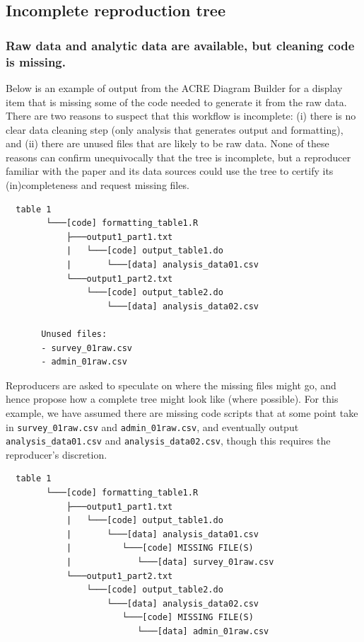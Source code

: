 \documentclass[]{book}
\begin{document}
\hypertarget{incomplete-reproduction-tree}{%
\subsection{Incomplete reproduction tree}\label{incomplete-reproduction-tree}}

\hypertarget{raw-data-and-analytic-data-are-available-but-cleaning-code-is-missing.}{%
\subsubsection{Raw data and analytic data are available, but cleaning code is missing.}\label{raw-data-and-analytic-data-are-available-but-cleaning-code-is-missing.}}

Below is an example of output from the ACRE Diagram Builder for a display item that is missing some of the code needed to generate it from the raw data. There are two reasons to suspect that this workflow is incomplete: (i) there is no clear data cleaning step (only analysis that generates output and formatting), and (ii) there are unused files that are likely to be raw data. None of these reasons can confirm unequivocally that the tree is incomplete, but a reproducer familiar with the paper and its data sources could use the tree to certify its (in)completeness and request missing files.

\begin{verbatim}
  table 1
        └───[code] formatting_table1.R
            ├───output1_part1.txt  
            |   └───[code] output_table1.do           
            |       └───[data] analysis_data01.csv
            └───output1_part2.txt  
                └───[code] output_table2.do           
                    └───[data] analysis_data02.csv

       Unused files: 
       - survey_01raw.csv
       - admin_01raw.csv  
\end{verbatim}

Reproducers are asked to speculate on where the missing files might go, and hence propose how a complete tree might look like (where possible). For this example, we have assumed there are missing code scripts that at some point take in \texttt{survey\_01raw.csv} and \texttt{admin\_01raw.csv}, and eventually output \texttt{analysis\_data01.csv} and \texttt{analysis\_data02.csv}, though this requires the reproducer's discretion.

\begin{verbatim}
  table 1
        └───[code] formatting_table1.R
            ├───output1_part1.txt  
            |   └───[code] output_table1.do           
            |       └───[data] analysis_data01.csv
            |          └───[code] MISSING FILE(S)
            |             └───[data] survey_01raw.csv
            └───output1_part2.txt  
                └───[code] output_table2.do           
                    └───[data] analysis_data02.csv
                       └───[code] MISSING FILE(S)
                          └───[data] admin_01raw.csv  
\end{verbatim}
\end{document}
